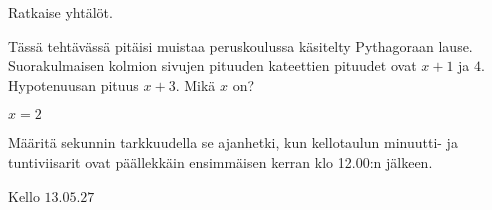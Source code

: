 \begin{tehtavasivu}
\begin{tehtava}
    Ratkaise yhtälöt.
    \begin{alakohdat}
    \end{alakohdat}
    \begin{vastaus}
        \begin{alakohdat}
        \end{alakohdat}
    \end{vastaus}
\end{tehtava}

\begin{tehtava}
    Tässä tehtävässä pitäisi muistaa peruskoulussa käsitelty Pythagoraan lause.
    Suorakulmaisen kolmion sivujen pituuden kateettien pituudet ovat $x+1$ ja $4$. Hypotenuusan pituus $x+3$. Mikä $x$ on?
    \begin{vastaus}
		$x=2$
    \end{vastaus}
\end{tehtava}

\begin{tehtava}
    Määritä sekunnin tarkkuudella se ajanhetki, kun kellotaulun minuutti- ja tuntiviisarit ovat päällekkäin ensimmäisen kerran klo 12.00:n jälkeen.
    \begin{vastaus}
		Kello $13.05.27$
    \end{vastaus}
\end{tehtava}

\end{tehtavasivu}
